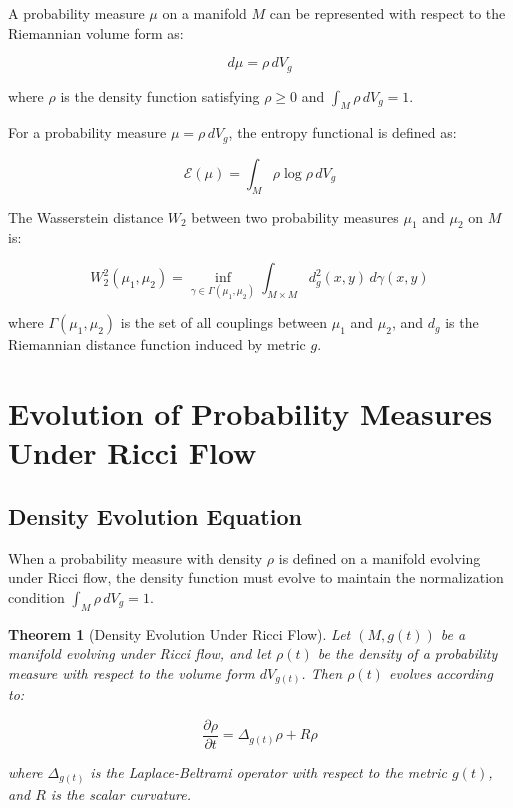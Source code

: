 \documentclass[12pt,a4paper]{article}
\newtheorem{theorem}{Theorem}
\begin{document}
A probability measure $\mu$ on a manifold $M$ can be represented with respect to the Riemannian volume form as:

\begin{equation}
d\mu = \rho \, dV_g
\end{equation}

\noindent where $\rho$ is the density function satisfying $\rho \geq 0$ and $\int_M \rho \, dV_g = 1$.

For a probability measure $\mu = \rho \, dV_g$, the entropy functional is defined as:

\begin{equation}
\mathcal{E}(\mu) = \int_M \rho \log \rho \, dV_g
\end{equation}

The Wasserstein distance $W_2$ between two probability measures $\mu_1$ and $\mu_2$ on $M$ is:

\begin{equation}
W_2^2(\mu_1, \mu_2) = \inf_{\gamma \in \Gamma(\mu_1, \mu_2)} \int_{M \times M} d_g^2(x, y) \, d\gamma(x, y)
\end{equation}

\noindent where $\Gamma(\mu_1, \mu_2)$ is the set of all couplings between $\mu_1$ and $\mu_2$, and $d_g$ is the Riemannian distance function induced by metric $g$.

\section{Evolution of Probability Measures Under Ricci Flow}

\subsection{Density Evolution Equation}

When a probability measure with density $\rho$ is defined on a manifold evolving under Ricci flow, the density function must evolve to maintain the normalization condition $\int_M \rho \, dV_g = 1$.

\begin{theorem}[Density Evolution Under Ricci Flow]
Let $(M, g(t))$ be a manifold evolving under Ricci flow, and let $\rho(t)$ be the density of a probability measure with respect to the volume form $dV_{g(t)}$. Then $\rho(t)$ evolves according to:

\begin{equation}
\frac{\partial \rho}{\partial t} = \Delta_{g(t)} \rho + R \rho
\end{equation}

\noindent where $\Delta_{g(t)}$ is the Laplace-Beltrami operator with respect to the metric $g(t)$, and $R$ is the scalar curvature.
\end{theorem}
\end{document}
